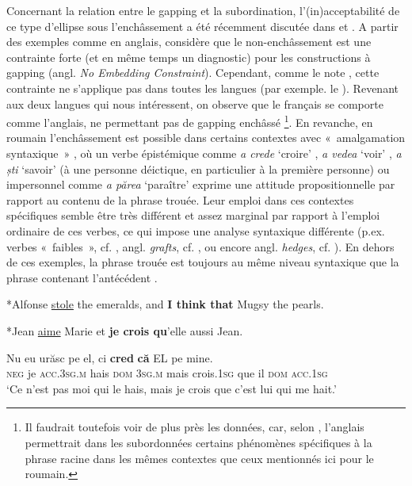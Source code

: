 Concernant la relation entre le gapping et la subordination, l’(in)acceptabilité de ce type d’ellipse sous l’enchâssement a été récemment discutée dans \citet{Farudi2013} et \citet{Johnson2014}. A partir des exemples comme  en anglais, \citet{Johnson2014} considère que le non-enchâssement est une contrainte forte (et en même temps un diagnostic) pour les constructions à gapping (angl. \textit{No Embedding Constraint}). Cependant, comme le note \citet{Farudi2013}, cette contrainte ne s’applique pas dans toutes les langues (par exemple. le ). Revenant aux deux langues qui nous intéressent, on observe que le français se comporte comme l’anglais, ne permettant pas de gapping enchâssé \footnote{
 Il faudrait toutefois voir de plus près les données, car, selon \citet{Green1976}, l’anglais permettrait dans les subordonnées certains phénomènes spécifiques à la phrase racine dans les mêmes contextes que ceux mentionnés ici pour le roumain.}. En revanche, en roumain l’enchâssement est possible dans certains contextes avec «~amalgamation syntaxique~» \citep{Lakoff1974}, où un verbe épistémique comme \textit{a crede} ‘croire’ , \textit{a vedea} ‘voir’ , \textit{a ști} ‘savoir’  (à une personne déictique, en particulier à la première personne) ou impersonnel comme \textit{a părea} ‘paraître’  exprime une attitude propositionnelle par rapport au contenu de la phrase trouée. Leur emploi dans ces contextes spécifiques semble être très différent et assez marginal par rapport à l’emploi ordinaire de ces verbes, ce qui impose une analyse syntaxique différente (p.ex. verbes «~faibles~», cf. \citealt{Blanche-BenvenisteEtAl2007}, angl. \textit{grafts}, cf. \citealt{vanRiemsdijk2006}, ou encore angl. \textit{hedges}, cf. \citealt{Lakoff1973}). En dehors de ces exemples, la phrase trouée est toujours au même niveau syntaxique que la phrase contenant l’antécédent \citep{Lobeck1995}.

\ea \label{ch2:ex46}
*Alfonse \uline{stole} the emeralds, and \textbf{I think that} Mugsy the pearls. \citep{Hankamer1979}
\z

\ea \label{ch2:ex47}
*Jean \uline{aime} Marie et \textbf{je crois qu}’elle aussi Jean.
\z

\ea
\ea 
\gll Nu  eu    urăsc  pe  el,  ci  \textbf{cred} \textbf{că}  EL  pe  mine. \label{ch2:ex48a}\\
\textsc{neg} je  \textsc{acc.3sg.m} hais  \textsc{dom} \textsc{3sg.m}  mais  crois.\textsc{1sg}  que  il \textsc{dom} \textsc{acc.1sg}\\ 
\glt ‘Ce n’est pas moi qui le hais, mais je crois que c’est lui qui me hait.’    

